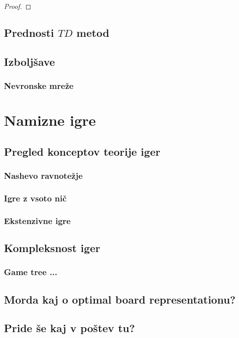\documentclass[12pt,a4paper]{amsart}
\theoremstyle{definition} %
\theoremstyle{plain} %
\begin{document}
\begin{proof}
    
\end{proof}


\subsection{Prednosti $TD$ metod}


\subsection{Izboljšave}
\subsubsection{Nevronske mreže}


\section{Namizne igre}

\subsection{Pregled konceptov teorije iger}
\subsubsection{Nashevo ravnotežje}
\subsubsection{Igre z vsoto nič}
\subsubsection{Ekstenzivne igre}

\subsection{Kompleksnost iger}
\subsubsection{Game tree ...}

\subsection{Morda kaj o optimal board representationu?}
\subsection{Pride še kaj v poštev tu?}
\end{document}
